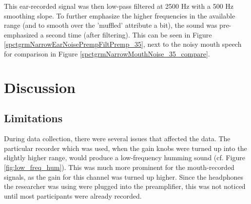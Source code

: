 \documentclass[dissertation,copyright]{uathesis}
\begin{document}
This ear-recorded signal was then low-pass filtered at 2500 Hz with a 500 Hz smoothing slope. To further emphasize the higher frequencies in the available range (and to smooth over the 'muffled' attribute a bit), the sound was pre-emphasized a second time (after filtering).  This can be seen in Figure \ref{spctgrmNarrowEarNoisePrempFiltPremp_35}, next to the noisy mouth speech for comparison in Figure \ref{spctgrmNarrowMouthNoise_35_compare}.

\section{Discussion}

\subsection{Limitations}
\label{ch2:limitations}

During data collection, there were several issues that affected the data.  
The particular recorder which was used, when the gain knobs were turned up into the slightly higher range, would produce a low-frequency humming sound (cf. Figure \ref{fig:low_freq_hum}).  This was much more prominent for the mouth-recorded signals, as the gain for this channel was turned up higher.  Since the headphones the researcher was using were plugged into the preamplifier, this was not noticed until most participants were already recorded.
\end{document}
